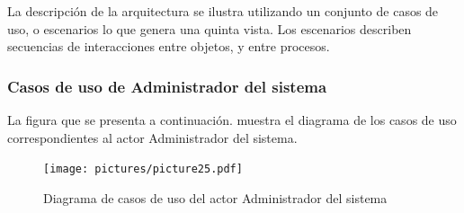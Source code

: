 La descripción de la arquitectura se ilustra utilizando un conjunto de casos de uso, o escenarios lo que genera una quinta vista. Los escenarios describen secuencias de interacciones entre objetos, y entre procesos. 



\subsubsection{Casos de uso de Administrador del sistema}

La figura que se presenta a continuación. muestra el diagrama de los casos de uso correspondientes al actor Administrador del sistema.

\begin{figure}[H]
\centering
\texttt{[image: pictures/picture25.pdf]}
\caption{Diagrama de casos de uso del actor Administrador del sistema}
\end{figure}

